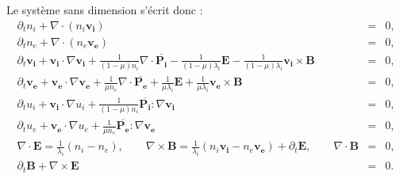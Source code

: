 Le système sans dimension s'écrit donc :
\begin{eqnarray}
  \label{eq:model_adbi_ri} \partial_t n_i + \nabla \cdot \left(n_i \boldsymbol{v_i}\right) &=& 0, \\
  \label{eq:model_adbi_re} \partial_t n_e + \nabla \cdot \left(n_e \boldsymbol{v_e}\right) &=& 0, \\
  \label{eq:model_adbi_vi} \partial_t  \boldsymbol{v_i} +\boldsymbol{v_i} \cdot \nabla \boldsymbol{v_i} + \frac{1}{(1-\mu) n_i} \nabla \cdot \overline{\boldsymbol{P_i}} - \frac{1}{(1-\mu)\lambda_i} \boldsymbol{E} - \frac{1}{(1-\mu)\lambda_i}  \boldsymbol{v_i} \times \boldsymbol{B} &=& 0 ,\\
  \label{eq:model_adbi_ve}  \partial_t  \boldsymbol{v_e} +\boldsymbol{v_e} \cdot \nabla \boldsymbol{v_e} + \frac{1}{\mu n_e} \nabla \cdot \overline{\boldsymbol{P_e}} + \frac{1}{\mu \lambda_i}  \boldsymbol{E} + \frac{1}{\mu \lambda_i} \boldsymbol{v_e} \times \boldsymbol{B} &=& 0 ,\\
  \label{eq:model_adbi_ui} \partial_t  u_i + \boldsymbol{v_i} \cdot \nabla u_i   + \frac{1}{(1-\mu)n_i} \overline{\boldsymbol{P_i}} : \nabla \boldsymbol{v_i}   &=& 0 ,\\
\label{eq:model_adbi_ue} \partial_t  u_e + \boldsymbol{v_e} \cdot \nabla u_e   + \frac{1}{\mu n_e} \overline{\boldsymbol{P_e}} : \nabla \boldsymbol{v_e}   &=& 0 ,\\
\label{eq:model_adbi_EB1} \nabla \cdot \boldsymbol{E} =   \frac{1}{\lambda_i} (n_i -n_e) ,\qquad \nabla \times \boldsymbol{B} = \frac{1}{\lambda_i} (n_i \boldsymbol{v_i} - n_e \boldsymbol{v_e}) +  \partial_t \boldsymbol{E} ,
\qquad \nabla \cdot \boldsymbol{B} &=& 0  ,  \\
\label{eq:model_adbi_EB4}  \partial_t \boldsymbol{B}  + \nabla \times \boldsymbol{E}  &=& 0.

\end{eqnarray}
